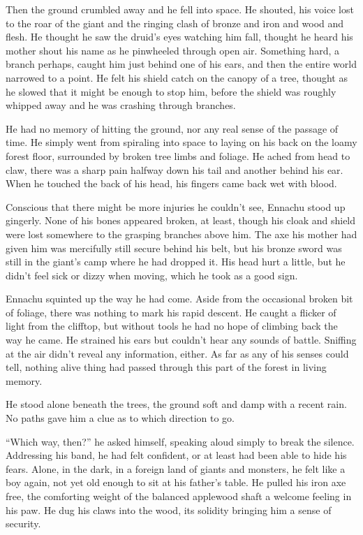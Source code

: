 Then the ground crumbled away and he fell into space. He shouted, his voice lost to the roar of the giant and the ringing clash of bronze and iron and wood and flesh. He thought he saw the druid's eyes watching him fall, thought he heard his mother shout his name as he pinwheeled through open air. Something hard, a branch perhaps, caught him just behind one of his ears, and then the entire world narrowed to a point. He felt his shield catch on the canopy of a tree, thought as he slowed that it might be enough to stop him, before the shield was roughly whipped away and he was crashing through branches.

He had no memory of hitting the ground, nor any real sense of the passage of time. He simply went from spiraling into space to laying on his back on the loamy forest floor, surrounded by broken tree limbs and foliage. He ached from head to claw, there was a sharp pain halfway down his tail and another behind his ear. When he touched the back of his head, his fingers came back wet with blood.

Conscious that there might be more injuries he couldn't see, Ennachu stood up gingerly. None of his bones appeared broken, at least, though his cloak and shield were lost somewhere to the grasping branches above him. The axe his mother had given him was mercifully still secure behind his belt, but his bronze sword was still in the giant's camp where he had dropped it. His head hurt a little, but he didn't feel sick or dizzy when moving, which he took as a good sign.

Ennachu squinted up the way he had come. Aside from the occasional broken bit of foliage, there was nothing to mark his rapid descent. He caught a flicker of light from the clifftop, but without tools he had no hope of climbing back the way he came. He strained his ears but couldn't hear any sounds of battle. Sniffing at the air didn't reveal any information, either. As far as any of his senses could tell, nothing alive thing had passed through this part of the forest in living memory.

He stood alone beneath the trees, the ground soft and damp with a recent rain. No paths gave him a clue as to which direction to go.

``Which way, then?'' he asked himself, speaking aloud simply to break the silence. Addressing his band, he had felt confident, or at least had been able to hide his fears. Alone, in the dark, in a foreign land of giants and monsters, he felt like a boy again, not yet old enough to sit at his father's table. He pulled his iron axe free, the comforting weight of the balanced applewood shaft a welcome feeling in his paw. He dug his claws into the wood, its solidity bringing him a sense of security.

